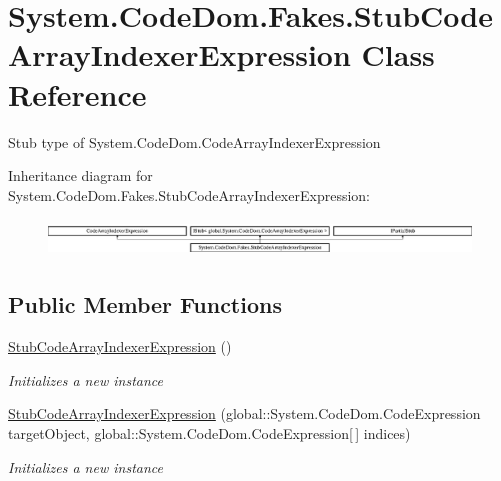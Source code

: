 \hypertarget{class_system_1_1_code_dom_1_1_fakes_1_1_stub_code_array_indexer_expression}{\section{System.\-Code\-Dom.\-Fakes.\-Stub\-Code\-Array\-Indexer\-Expression Class Reference}
\label{class_system_1_1_code_dom_1_1_fakes_1_1_stub_code_array_indexer_expression}
}


Stub type of System.\-Code\-Dom.\-Code\-Array\-Indexer\-Expression 


Inheritance diagram for System.\-Code\-Dom.\-Fakes.\-Stub\-Code\-Array\-Indexer\-Expression\-:\begin{figure}[H]
\begin{center}
\leavevmode
\includegraphics[height=0.982456cm]{class_system_1_1_code_dom_1_1_fakes_1_1_stub_code_array_indexer_expression}
\end{center}
\end{figure}
\subsection*{Public Member Functions}
\begin{DoxyCompactItemize}
\item 
\hyperlink{class_system_1_1_code_dom_1_1_fakes_1_1_stub_code_array_indexer_expression_abac19e7df37ccd1bae42bf61d4025b14}{Stub\-Code\-Array\-Indexer\-Expression} ()
\begin{DoxyCompactList}\small\item\em Initializes a new instance\end{DoxyCompactList}\item 
\hyperlink{class_system_1_1_code_dom_1_1_fakes_1_1_stub_code_array_indexer_expression_abe857741bc4c80130f416224ab3263c3}{Stub\-Code\-Array\-Indexer\-Expression} (global\-::\-System.\-Code\-Dom.\-Code\-Expression target\-Object, global\-::\-System.\-Code\-Dom.\-Code\-Expression\mbox{[}$\,$\mbox{]} indices)
\begin{DoxyCompactList}\small\item\em Initializes a new instance\end{DoxyCompactList}\end{DoxyCompactItemize}
